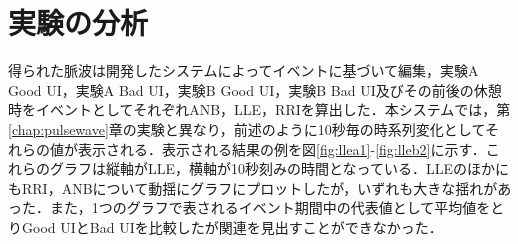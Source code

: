 \section{実験の分析}

得られた脈波は開発したシステムによってイベントに基づいて編集，実験A Good UI，実験A Bad UI，実験B Good UI，実験B Bad UI及びその前後の休憩時をイベントとしてそれぞれANB，LLE，RRIを算出した．本システムでは，第\ref{chap:pulsewave}章の実験と異なり，前述のように10秒毎の時系列変化としてそれらの値が表示される．表示される結果の例を図\ref{fig:llea1}-\ref{fig:lleb2}に示す．これらのグラフは縦軸がLLE，横軸が10秒刻みの時間となっている．LLEのほかにもRRI，ANBについて動揺にグラフにプロットしたが，いずれも大きな揺れがあった．また，1つのグラフで表されるイベント期間中の代表値として平均値をとりGood UIとBad UIを比較したが関連を見出すことができなかった．

